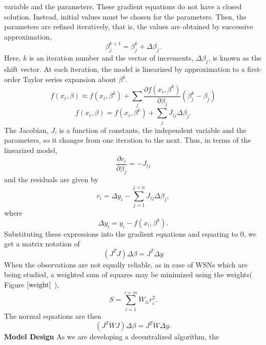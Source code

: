 \documentclass[journal]{IEEEtran}
\begin{document}
variable and the parameters. These gradient equations do not have a
closed solution. Instead, initial values must be chosen for the
parameters. Then, the parameters are refined iteratively, that is,
the values are obtained by successive approximation,
\begin{equation}
    \beta_j^{k+1}=\beta^k_j+\Delta \beta_j.
\end{equation}
Here, $k$ is an iteration number and the vector of increments,
$\Delta \beta_j$, is known as the shift vector. At each iteration,
the model is linearized by approximation to a first-order Taylor
series expansion about $\beta^k$.
\begin{equation}
    f(x_i,\beta)\approx f(x_i,\beta^k) +\sum_j \frac{\partial f(x_i, \beta^k)}{\partial \beta_j} \left(\beta^k_j -\beta_j \right)
\end{equation}
\begin{equation}
 f(x_i,\beta) =f(x_i, \beta^k)+\sum_j J_{ij} \Delta\beta_j.
\end{equation}
The Jacobian, $J$, is a function of constants, the independent
variable and the parameters, so it changes from one iteration to the
next. Thus, in terms of the linearized model,
\begin{equation}
\frac{\partial r_i}{\partial \beta_j}=-J_{ij}
\end{equation}
and the residuals are given by
\begin{equation}
    r_i=\Delta y_i- \sum_{j=1}^{j=n} J_{ij}\Delta\beta_j,
\end{equation}
where
\begin{equation}
 \Delta y_i=y_i- f(x_i, \beta^k).
\end{equation}
Substituting these expressions into the gradient equations and
equating to $0$, we get a matrix notation of
\begin{equation}
    \left(J^TJ\right)\Delta  \beta=J^T\Delta y
\end{equation}
When the observations are not equally reliable, as in case of WSNs
which are being studied, a weighted sum of squares may be minimized
using the weights( Figure $\ref{weight}$ ),
\begin{equation}
    S=\sum_{i=1}^{i=m}W_{ii}r_i^2.
\end{equation}
The normal equations are then
\begin{equation}
    \left(J^TWJ\right)\Delta  \beta=J^TW\Delta y.
\end{equation}
\textbf{Model Design}\newline
As we are developing a decentralized algorithm, the
\end{document}
